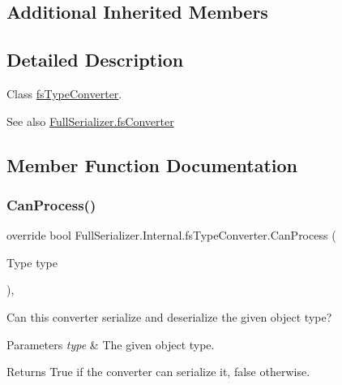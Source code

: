 \subsection*{Additional Inherited Members}


\subsection{Detailed Description}
Class \hyperlink{class_full_serializer_1_1_internal_1_1fs_type_converter}{fs\+Type\+Converter}. 

\begin{DoxySeeAlso}{See also}
\hyperlink{class_full_serializer_1_1fs_converter}{Full\+Serializer.\+fs\+Converter}


\end{DoxySeeAlso}


\subsection{Member Function Documentation}
\mbox{\label{class_full_serializer_1_1_internal_1_1fs_type_converter_afbf95621a91efff18569544dee5134fe}} 
\subsubsection{\texorpdfstring{Can\+Process()}{CanProcess()}}
{\footnotesize\ttfamily override bool Full\+Serializer.\+Internal.\+fs\+Type\+Converter.\+Can\+Process (\begin{DoxyParamCaption}\item[{Type}]{type }\end{DoxyParamCaption})\hspace{0.3cm}{\ttfamily [inline]}, {\ttfamily [virtual]}}



Can this converter serialize and deserialize the given object type? 


\begin{DoxyParams}{Parameters}
{\em type} & The given object type.\\
\hline
\end{DoxyParams}
\begin{DoxyReturn}{Returns}
True if the converter can serialize it, false otherwise.
\end{DoxyReturn}


